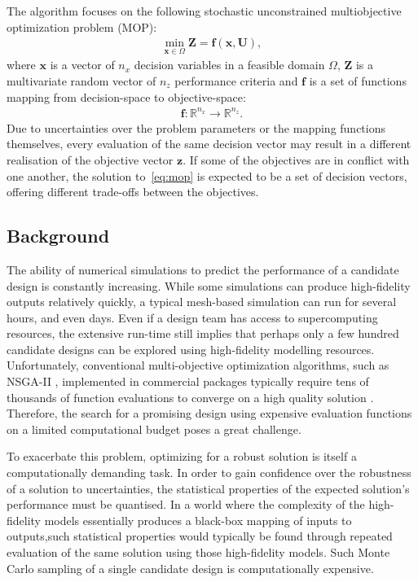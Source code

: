 \documentclass[10pt]{llncs}
\newcommand{\brr}[1]{{\left({#1}\right)}} %
\newcommand{\vx}{\mathbf{x}} %
\newcommand{\vf}{\mathbf{f}} %
\newcommand{\vz}{\mathbf{z}} %
\newcommand{\vZ}{\mathbf{Z}} %
\newcommand{\vU}{\mathbf{U}} %
\begin{document}
The algorithm focuses on the following stochastic unconstrained multiobjective optimization problem (MOP):
\begin{align}
\label{eq:mop}
	\min_{\vx\in\Omega} \vZ=\vf\brr{\vx, \vU},
\end{align}
where $\vx$ is a vector of $n_x$ decision variables in a feasible domain $\Omega$, $\vZ$ is a multivariate random vector of $n_z$ performance criteria and $\vf$ is a set of functions mapping from decision-space to objective-space:
\begin{align}
	\vf: \mathbb{R}^{n_x} \rightarrow \mathbb{R}^{n_z}.
\end{align}
Due to uncertainties over the problem parameters or the mapping functions themselves, every evaluation of the same decision vector may result in a different realisation of the objective vector $\vz$.
If some of the objectives are in conflict with one another, the solution to~\eqref{eq:mop} is expected to be a set of decision vectors, offering different trade-offs between the objectives.

\subsection{\label{sec:intro}Background}

The ability of numerical simulations to predict the performance of a candidate
design is constantly increasing. While some simulations can produce high-fidelity outputs relatively quickly, a typical mesh-based simulation can run for several hours, and even days. Even if a design team has access to supercomputing resources, the extensive run-time still implies that perhaps only a few hundred candidate designs can be explored using high-fidelity modelling resources. Unfortunately, conventional multi-objective optimization algorithms,
such as NSGA-II \cite{deb2002fast}, implemented in commercial packages typically require tens
of thousands of function evaluations to converge on a high quality solution \cite{hansen2010comparing,zhou2011multiobjective}. Therefore, the search for a promising design using expensive evaluation functions on a limited computational budget poses a great challenge.

To exacerbate this problem, optimizing for a robust solution is itself a computationally
demanding task. In order to gain confidence over the robustness of a solution to uncertainties, the statistical properties of the expected solution's performance must be quantised. In a world where the complexity of the high-fidelity models essentially produces a black-box mapping of inputs to outputs,such statistical properties would typically be found through repeated evaluation of the same solution using those high-fidelity models. Such Monte Carlo
sampling of a single candidate design is computationally expensive.
\end{document}

